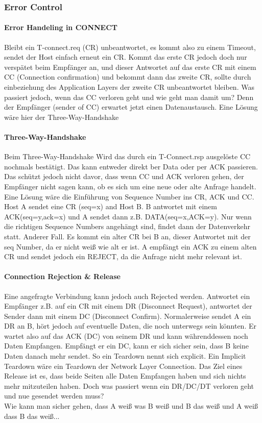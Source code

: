 		\subsubsection{Error Control}
			\paragraph{Error Handeling in CONNECT}
				Bleibt ein T-connect.req (CR) unbeantwortet, es kommt also zu einem Timeout, sendet der Host einfach erneut ein CR. Kommt das erste CR jedoch doch nur verspätet beim Empfänger an, und dieser Antwortet auf das erste CR mit einem CC (Connection confirmation) und bekommt dann das zweite CR, sollte durch einbeziehung des Application Layers der zweite CR unbeantwortet bleiben. Was passiert jedoch, wenn das CC verloren geht und wie geht man damit um? Denn der Empfänger (sender of CC) erwartet jetzt einen Datenaustausch. Eine Lösung wäre hier der Three-Way-Handshake

			\paragraph{Three-Way-Handshake}
				Beim Three-Way-Handshake Wird das durch ein T-Connect.rsp ausgelöste CC nochmals bestätigt. Das kann entweder direkt ber Data oder per ACK passieren. Das schützt jedoch nicht davor, dass wenn CC und ACK verloren gehen, der Empfänger nicht sagen kann, ob es sich um eine neue oder alte Anfrage handelt. Eine Lösung wäre die Einführung von Sequence Number ins CR, ACK und CC. Host A sendet eine CR (seq=x) and Host B. B antwortet mit einem ACK(seq=y,ack=x) und A sendet dann z.B. DATA(seq=x,ACK=y). Nur wenn die richtigen Sequence Numbers angehängt sind, findet dann der Datenverkehr statt. Anderer Fall. Es kommt ein alter CR bei B an, dieser Antwortet mit der seq Number, da er nicht weiß wie alt er ist. A empfängt ein ACK zu einem alten CR und sendet jedoch ein REJECT, da die Anfrage nicht mehr relevant ist. 
			
			\paragraph{Connection Rejection \& Release}
				Eine angefragte Verbindung kann jedoch auch Rejected werden. Antwortet ein Empfänger z.B. auf ein CR mit einem DR (Disconnect Request), antwortet der Sender dann mit einem DC (Disconnect Confirm). Normalerweise sendet A ein DR an B, hört jedoch auf eventuelle Daten, die noch unterwegs sein könnten. Er wartet also auf das ACK (DC) von seinem DR und kann währenddessen noch Daten Empfangen. Empfängt er ein DC, kann er sich sicher sein, dass B keine Daten danach mehr sendet. So ein Teardown nennt sich explicit. Ein Implicit Teardown wäre ein Teardown der Network Layer Connection. Das Ziel eines Release ist es, dass beide Seiten alle Daten Empfangen haben und sich nichts mehr mitzuteilen haben. Doch was passiert wenn ein DR/DC/DT verloren geht und nue gesendet werden muss? \\
				Wie kann man sicher gehen, dass A weiß was B weiß und B das weiß und A weiß dass B das weiß... 
		
